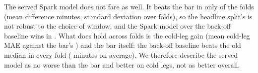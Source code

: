 The served Spark model does not fare as well. It beats the bar in only \fzRoServedBeatsBarFolds{} of the \fzRoFolds{} folds (mean difference \fzRoServedDeltaMeanDpTwo{} minutes, standard deviation \fzRoServedDeltaSdDpTwo{} over folds), so the headline split's \fzServedVsBarDeltaDpTwo{} is not robust to the choice of window, and the Spark model over the back-off baseline wins in \fzRoVThreeBeatsBarFolds{}. What does hold across folds is the cold-leg gain (mean cold-leg MAE \fzRoColdServedMaeDpOne{} against the bar's \fzRoColdBarMaeDpOne{}) and the bar itself: the back-off baseline beats the old median in every fold (\fzRoBarVsOldDeltaMeanDpTwo{} minutes on average). We therefore describe the served model as no worse than the bar and better on cold legs, not as better overall.
